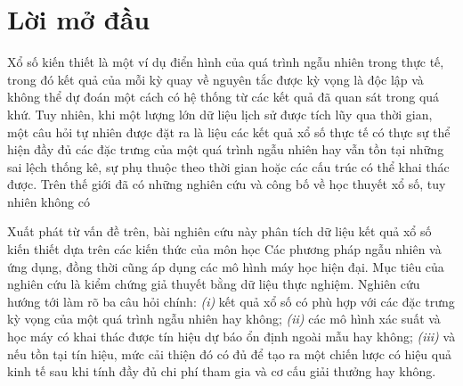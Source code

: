 \chapter*{Lời mở đầu}

Xổ số kiến thiết là một ví dụ điển hình của quá trình ngẫu nhiên trong thực tế, 
trong đó kết quả của mỗi kỳ quay về nguyên tắc được kỳ vọng là độc lập và không 
thể dự đoán một cách có hệ thống từ các kết quả đã quan sát trong quá khứ. Tuy 
nhiên, khi một lượng lớn dữ liệu lịch sử được tích lũy qua thời gian, một câu hỏi 
tự nhiên được đặt ra là liệu các kết quả xổ số thực tế có thực sự thể hiện đầy đủ 
các đặc trưng của một quá trình ngẫu nhiên hay vẫn tồn tại những sai lệch thống kê, 
sự phụ thuộc theo thời gian hoặc các cấu trúc có thể khai thác được.
Trên thế giới đã có những nghiên cứu và công bố về học thuyết xổ số, tuy nhiên không có 

Xuất phát từ vấn đề trên, bài nghiên cứu này phân tích dữ liệu kết quả xổ số kiến thiết dựa trên các kiến thức của môn học Các phương pháp ngẫu nhiên và ứng dụng, đồng thời cũng áp dụng các mô hình máy học hiện đại. Mục tiêu của nghiên cứu là kiểm chứng giả thuyết bằng dữ liệu thực nghiệm. Nghiên cứu 
hướng tới làm rõ ba câu hỏi chính: \textit{(i)} kết quả xổ số có phù hợp với các đặc trưng kỳ 
vọng của một quá trình ngẫu nhiên hay không; \textit{(ii)} các mô hình xác suất và học máy có 
khai thác được tín hiệu dự báo ổn định ngoài mẫu hay không; \textit{(iii)} và nếu tồn tại tín hiệu, 
mức cải thiện đó có đủ để tạo ra một chiến lược có hiệu quả kinh tế sau khi tính 
đầy đủ chi phí tham gia và cơ cấu giải thưởng hay không.